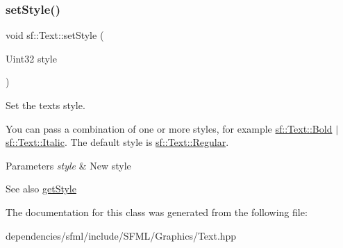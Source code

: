 \subsubsection{\texorpdfstring{set\+Style()}{setStyle()}}
{\footnotesize\ttfamily void sf\+::\+Text\+::set\+Style (\begin{DoxyParamCaption}\item[{Uint32}]{style }\end{DoxyParamCaption})}



Set the text\textquotesingle{}s style. 

You can pass a combination of one or more styles, for example \hyperlink{classsf_1_1_text_aa8add4aef484c6e6b20faff07452bd82af1b47f98fb1e10509ba930a596987171}{sf\+::\+Text\+::\+Bold} $\vert$ \hyperlink{classsf_1_1_text_aa8add4aef484c6e6b20faff07452bd82aee249eb803848723c542c2062ebe69d8}{sf\+::\+Text\+::\+Italic}. The default style is \hyperlink{classsf_1_1_text_aa8add4aef484c6e6b20faff07452bd82a2af9ae5e1cda126570f744448e0caa32}{sf\+::\+Text\+::\+Regular}.


\begin{DoxyParams}{Parameters}
{\em style} & New style\\
\hline
\end{DoxyParams}
\begin{DoxySeeAlso}{See also}
\hyperlink{classsf_1_1_text_a0da79b0c057f4bb51592465a205c35d7}{get\+Style} 
\end{DoxySeeAlso}


The documentation for this class was generated from the following file\+:\begin{DoxyCompactItemize}
\item 
dependencies/sfml/include/\+S\+F\+M\+L/\+Graphics/Text.\+hpp\end{DoxyCompactItemize}
